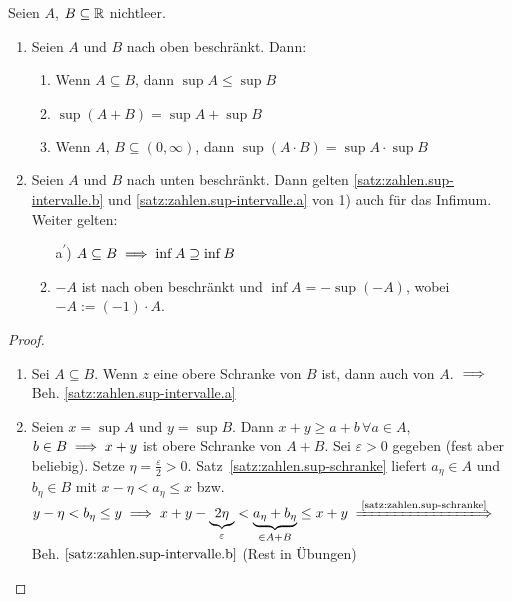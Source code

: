 \documentclass[12pt]{scrreprt}
\begin{document}
\begin{satz}\label{satz:zahlen.sup-intervalle}
Seien $A$, $B \subseteq \mathbb{R}$ nichtleer.
\begin{enumerate}
\item Seien $A$ und $B$ nach oben beschränkt. Dann:
	\begin{enumerate}
	\item \label{satz:zahlen.sup-intervalle.a}
		Wenn $A \subseteq B$, dann $\sup A \le \sup B$
	\item \label{satz:zahlen.sup-intervalle.b}
		$\sup (A+B) = \sup A + \sup B$
	\item \label{satz:zahlen.sup-intervalle.c}
		Wenn $A$, $B \subseteq (0, \infty)$, dann $\sup(A\cdot B) = \sup A \cdot \sup B$
	\end{enumerate}
\item Seien $A$ und $B$ nach unten beschränkt. Dann gelten
	\ref{satz:zahlen.sup-intervalle.b} und \ref{satz:zahlen.sup-intervalle.a} von 1) auch für das Infimum. Weiter gelten:
	\begin{enumerate} %
	\item[a\textsuperscript{$\prime$})] \label{satz:zahlen.sup-intervalle.a2}
	$A \subseteq B \implies \inf A \supseteq \inf B$
	\setcounter{enumii}{3}
	\item \label{satz:zahlen.sup-intervalle.d}
	$-A$ ist nach oben beschränkt und $\inf A = -\sup(-A)$, wobei $-A:=(-1)\cdot A$.
	\end{enumerate}
\end{enumerate}
\end{satz}
\begin{proof}
\begin{enumerate}
\item Sei $A\subseteq B$. Wenn $z$ eine obere Schranke von $B$ ist, dann auch von $A$. $\implies$ Beh. \ref{satz:zahlen.sup-intervalle.a}
\item Seien $x=\sup A$ und $y = \sup B$. Dann $x+y\ge a+b\,\forall a \in A$, $b\in B \implies x+y $ ist obere Schranke von $A+B$. Sei $\varepsilon >0$
gegeben (fest aber beliebig). Setze  $\eta = \frac{\varepsilon}{2} > 0$. Satz~\ref{satz:zahlen.sup-schranke} liefert $a_\eta \in A$ und 
$b_\eta \in B$ mit $x-\eta < a_\eta \le x$ bzw. $y-\eta < b_\eta \le y
\folgt x+y-\underbrace{2\eta}_\varepsilon < \underbrace{a_\eta + b_\eta}_{\in A+B} \le x+y \folgtnach{\ref{satz:zahlen.sup-schranke}}$ Beh. $\ref{satz:zahlen.sup-intervalle.b}$
(Rest in Übungen)
\end{enumerate}
\end{proof}
\end{document}
